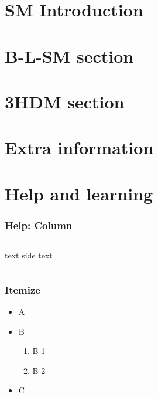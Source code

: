 \documentclass[10pt]{beamer}
\begin{document}
	\section{SM Introduction}
	
	\section{B-L-SM section} 
	
	\section{3HDM section}
	
	\section{Extra information}
	
	\section{Help and learning}

	\begin{frame}
		\frametitle{Help: Column}
		
		\begin{columns}
			text 
			side text~
		\end{columns}
	\end{frame}
	
	\begin{frame}
		\frametitle{Itemize}
		
		\begin{itemize}
			\item A 
			\item B 
			\begin{enumerate}
				\item B-1 
				\item B-2 
			\end{enumerate}
		\item C	
	\end{itemize}
		
	\end{frame}


	
\end{document}
